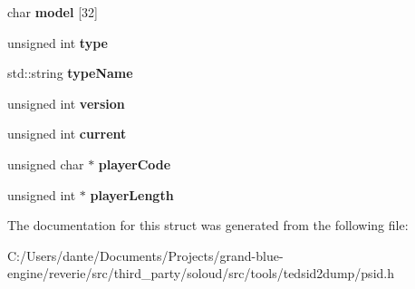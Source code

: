 \begin{DoxyCompactItemize}
char {\bfseries model} \mbox{[}32\mbox{]}
\item 
\mbox{\label{struct_psid_header_a30538fa8afc7ed1ceaa17e80281e2284}} 
unsigned int {\bfseries type}
\item 
\mbox{\label{struct_psid_header_aa089fc276a2538fba7172ba937bdc267}} 
std\+::string {\bfseries type\+Name}
\item 
\mbox{\label{struct_psid_header_a10cc2f4c79c5582298671456fc0e8623}} 
unsigned int {\bfseries version}
\item 
\mbox{\label{struct_psid_header_a34ef3f3642a8ba0cb294a1de2ed9c244}} 
unsigned int {\bfseries current}
\item 
\mbox{\label{struct_psid_header_a244aa84acca6a3c44b3e73cc0026f61c}} 
unsigned char $\ast$ {\bfseries player\+Code}
\item 
\mbox{\label{struct_psid_header_ac1b96d512dd6e819df398ff8fc9b4d4f}} 
unsigned int $\ast$ {\bfseries player\+Length}
\end{DoxyCompactItemize}


The documentation for this struct was generated from the following file\+:\begin{DoxyCompactItemize}
\item 
C\+:/\+Users/dante/\+Documents/\+Projects/grand-\/blue-\/engine/reverie/src/third\+\_\+party/soloud/src/tools/tedsid2dump/psid.\+h\end{DoxyCompactItemize}
